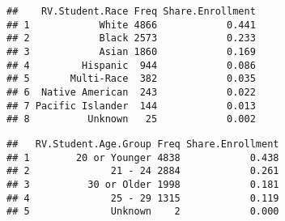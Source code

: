 \documentclass[]{article}
\newenvironment{Shaded}{\begin{snugshade}}{\end{snugshade}}
\newcommand{\KeywordTok}[1]{\textcolor[rgb]{0.13,0.29,0.53}{\textbf{#1}}}
\newcommand{\DataTypeTok}[1]{\textcolor[rgb]{0.13,0.29,0.53}{#1}}
\newcommand{\DecValTok}[1]{\textcolor[rgb]{0.00,0.00,0.81}{#1}}
\newcommand{\StringTok}[1]{\textcolor[rgb]{0.31,0.60,0.02}{#1}}
\newcommand{\OperatorTok}[1]{\textcolor[rgb]{0.81,0.36,0.00}{\textbf{#1}}}
\newcommand{\NormalTok}[1]{#1}
\begin{document}
\begin{verbatim}
##    RV.Student.Race Freq Share.Enrollment
## 1            White 4866            0.441
## 2            Black 2573            0.233
## 3            Asian 1860            0.169
## 4         Hispanic  944            0.086
## 5       Multi-Race  382            0.035
## 6  Native American  243            0.022
## 7 Pacific Islander  144            0.013
## 8          Unknown   25            0.002
\end{verbatim}

\begin{Shaded}
\end{Shaded}

\begin{verbatim}
##   RV.Student.Age.Group Freq Share.Enrollment
## 1        20 or Younger 4838            0.438
## 2              21 - 24 2884            0.261
## 3          30 or Older 1998            0.181
## 4              25 - 29 1315            0.119
## 5              Unknown    2            0.000
\end{verbatim}
\end{document}

